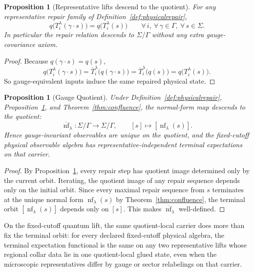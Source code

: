 \documentclass[11pt]{article}
\newtheorem{proposition}[theorem]{Proposition}
\newcommand{\nf}{\operatorname{nf}}
\begin{document}
\begin{proposition}[Representative lifts descend to the quotient]\label{prop:repairquot}
For any representative repair family of Definition~\ref{def:physicalrepair},
\[
q\bigl(T_i^\lambda(\gamma\cdot s)\bigr)=q\bigl(T_i^\lambda(s)\bigr)
\qquad
\forall\, i,\ \forall\, \gamma\in\Gamma,\ \forall\, s\in\Sigma.
\]
In particular the repair relation descends to \(\Sigma/\Gamma\) without any extra
gauge-covariance axiom.
\end{proposition}

\begin{proof}
Because \(q(\gamma\cdot s)=q(s)\),
\[
q\bigl(T_i^\lambda(\gamma\cdot s)\bigr)
=
\overline T_i^\lambda\bigl(q(\gamma\cdot s)\bigr)
=
\overline T_i^\lambda\bigl(q(s)\bigr)
=
q\bigl(T_i^\lambda(s)\bigr).
\]
So gauge-equivalent inputs induce the same repaired physical state.
\end{proof}

\begin{proposition}[Gauge Quotient]\label{prop:gauge}
Under Definition~\ref{def:physicalrepair}, Proposition~\ref{prop:repairquot}, and
Theorem~\ref{thm:confluence}, the normal-form map descends to the quotient:
\[
\overline{\nf}_\lambda:\Sigma/\Gamma\to\Sigma/\Gamma,
\qquad
[s]\mapsto [\nf_\lambda(s)].
\]
Hence gauge-invariant observables are unique on the quotient, and the fixed-cutoff physical
observable algebra has representative-independent terminal expectations on that carrier.
\end{proposition}

\begin{proof}
By Proposition~\ref{prop:repairquot}, every repair step has quotient image determined only by the
current orbit. Iterating, the quotient image of any repair sequence depends only on the initial
orbit. Since every maximal repair sequence from \(s\) terminates at the unique normal form
\(\nf_\lambda(s)\) by Theorem~\ref{thm:confluence}, the terminal orbit \([\nf_\lambda(s)]\)
depends only on \([s]\). This makes \(\overline{\nf}_\lambda\) well-defined.
\end{proof}

On the fixed-cutoff quantum lift, the same quotient-local carrier does more than fix the terminal
orbit: for every declared fixed-cutoff physical algebra, the terminal expectation functional is
the same on any two representative lifts whose regional collar data lie in one quotient-local
glued state, even when the microscopic representatives differ by gauge or sector relabelings on
that carrier.
\end{document}
